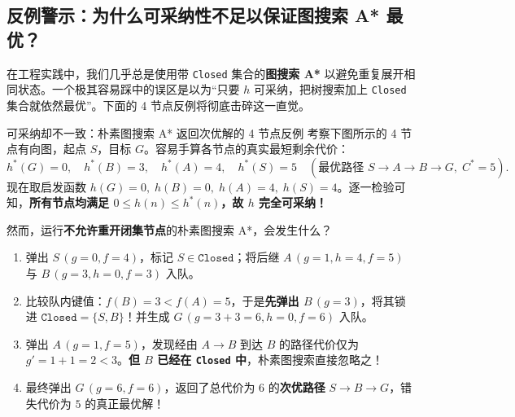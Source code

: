 \subsection{反例警示：为什么可采纳性不足以保证图搜索 A* 最优？}

在工程实践中，我们几乎总是使用带 \texttt{Closed} 集合的\textbf{图搜索 A*} 以避免重复展开相同状态。一个极其容易踩中的误区是以为“只要 $h$ 可采纳，把树搜索加上 \texttt{Closed} 集合就依然最优”。下面的 4 节点反例将彻底击碎这一直觉。

\begin{failBox}{可采纳却不一致：朴素图搜索 A* 返回次优解的 4 节点反例}
考察下图所示的 4 节点有向图，起点 $S$，目标 $G$。容易手算各节点的真实最短剩余代价：
\[
  h^*(G)=0,\quad h^*(B)=3,\quad h^*(A)=4,\quad h^*(S)=5\quad (\text{最优路径 } S\to A\to B\to G,\; C^*=5).
\]
现在取启发函数 $h(G)=0,\; h(B)=0,\; h(A)=4,\; h(S)=4$。逐一检验可知，\textbf{所有节点均满足 $0 \le h(n) \le h^*(n)$，故 $h$ 完全可采纳！}

然而，运行\textbf{不允许重开闭集节点}的朴素图搜索 A*，会发生什么？
\begin{enumerate}
  \item 弹出 $S\,(g{=}0, f{=}4)$，标记 $S\in\texttt{Closed}$；将后继 $A\,(g{=}1, h{=}4, f{=}5)$ 与 $B\,(g{=}3, h{=}0, f{=}3)$ 入队。
  \item 比较队内键值：$f(B)=3 < f(A)=5$，于是\textbf{先弹出 $B\,(g{=}3)$}，将其锁进 $\texttt{Closed}=\{S, B\}$！并生成 $G\,(g{=}3{+}3{=}6, h{=}0, f{=}6)$ 入队。
  \item 弹出 $A\,(g{=}1, f{=}5)$，发现经由 $A\to B$ 到达 $B$ 的路径代价仅为 $g'=1+1=2 < 3$。\textbf{但 $B$ 已经在 \texttt{Closed} 中}，朴素图搜索直接忽略之！
  \item 最终弹出 $G\,(g{=}6, f{=}6)$，返回了总代价为 $6$ 的\textbf{次优路径} $S\to B\to G$，错失代价为 $5$ 的真正最优解！
\end{enumerate}

\begin{center}
\end{center}
\end{failBox}
